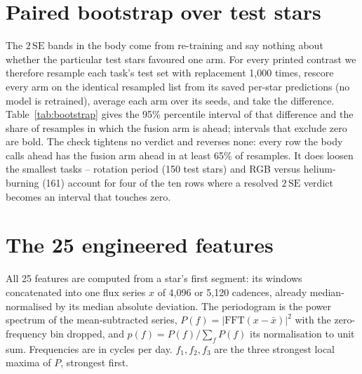 \documentclass{article}
\begin{document}
\section{Paired bootstrap over test stars}
\label{app:bootstrap}

The $2\,\mathrm{SE}$ bands in the body come from re-training and say nothing about whether the
particular test stars favoured one arm. For every printed contrast we therefore resample each task's
test set with replacement 1{,}000 times, rescore every arm on the identical resampled list from its
saved per-star predictions (no model is retrained), average each arm over its seeds, and take the
difference. Table~\ref{tab:bootstrap} gives the 95\% percentile interval of that difference and the
share of resamples in which the fusion arm is ahead; intervals that exclude zero are bold. The check
tightens no verdict and reverses none: every row the body calls ahead has the fusion arm ahead in at
least 65\% of resamples. It does loosen the smallest tasks -- rotation period (150 test stars) and
RGB versus helium-burning (161) account for four of the ten rows where a resolved $2\,\mathrm{SE}$
verdict becomes an interval that touches zero.

\begin{table}[H]
\caption{Paired star-bootstrap of the four contrasts the body counts. Each entry is the 95\% interval
of (left arm $-$ right arm) over 1{,}000 resamples of the test stars, seeds averaged, and the share of
resamples with the difference above zero ($f_{>0}$; 1.00 means the left arm is ahead in every
resample, 0.00 that it is behind in every resample). Bold: interval excludes zero.}
\label{tab:bootstrap}
\centering
\scriptsize
\setlength{\tabcolsep}{2pt}

\end{table}

\section{The 25 engineered features}
\label{app:features}

All 25 features are computed from a star's first segment: its windows concatenated into one flux
series $x$ of 4{,}096 or 5{,}120 cadences, already median-normalised by its median absolute
deviation. The periodogram is the power spectrum of the mean-subtracted series,
$P(f) = |\mathrm{FFT}(x - \bar{x})|^{2}$ with the zero-frequency bin dropped, and
$p(f) = P(f)/\sum_f P(f)$ its normalisation to unit sum. Frequencies are in cycles per day.
$f_{1}, f_{2}, f_{3}$ are the three strongest local maxima of $P$, strongest first.
\end{document}

